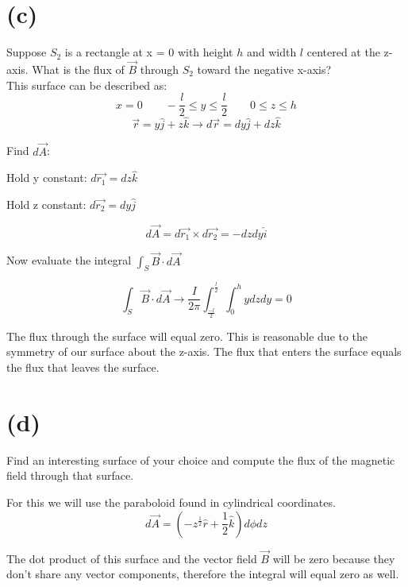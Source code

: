 \documentclass[11pt]{article}
\begin{document}
\section*{(c)}
Suppose $S_2$ is a rectangle at x = 0 with height $h$ and width $l$ centered at the z-axis. What is the flux of $\vec{B}$ through $S_2$ toward the negative x-axis?
\\

This surface can be  described as:
$$x = 0 \qquad -\frac{l}{2} \leq y \leq \frac{l}{2} \qquad 0 \leq z \leq h$$
$$\vec{r} = y\hat{j} + z\hat{k} \rightarrow d\vec{r} = dy\hat{j}+dz\hat{k}$$

Find $d\vec{A}$:

Hold y constant:
$d\vec{r_1} = dz\hat{k}$

Hold z constant:
$d\vec{r_2} = dy\hat{j}$

$$d\vec{A} = d\vec{r_1} \times d\vec{r_2} = -dzdy \hat{i}$$

Now evaluate the integral $\int_S \vec{B} \cdot d\vec{A}$

$$\int_S \vec{B} \cdot d\vec{A} \rightarrow \frac{I}{2\pi}\int_{\frac{-l}{2}}^{\frac{l}{2}}\int_0^hy dzdy = 0$$

The flux through the surface will equal zero. This is reasonable due to the symmetry of our surface about the z-axis. The flux that enters the surface equals the flux that leaves the surface.

\section*{(d)}
Find an interesting surface of your choice and compute the flux of the magnetic field through that surface.


For this we will use the paraboloid found in cylindrical coordinates.
$$d\vec{A} = (-z^\frac{1}{2}\hat{r}+\frac{1}{2}\hat{k})d\phi dz$$

The dot product of this surface and the vector field $\vec{B}$ will be zero because they don't share any vector components, therefore the integral will equal zero as well.
\end{document}
